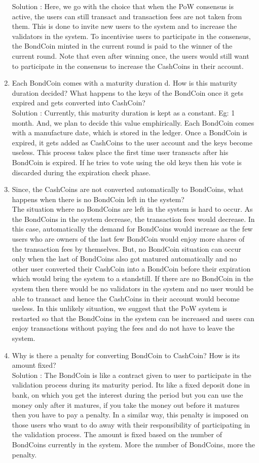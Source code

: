 \begin{enumerate}
    Solution : Here, we go with the choice that when the PoW consensus is active, the users can still transact and transaction fees are not taken from them. This is done to invite new users to the system and to increase the validators in the system. To incentivise users to participate in the consensus, the BondCoin minted in the current round is paid to the winner of the current round. Note that even after winning once, the users would still want to participate in the consensus to increase the CashCoins in their account.
    \item Each BondCoin comes with a maturity duration d. How is this maturity duration decided? What happens to the keys of the BondCoin once it gets expired and gets converted into CashCoin?\\
    Solution : Currently, this maturity duration is kept as a constant. Eg: 1 month. And, we plan to decide this value emphirically. Each BondCoin comes with a manufacture date, which is stored in the ledger. Once a BondCoin is expired, it gets added as CashCoins to the user account and the keys become useless. This process takes place the first time user transacts after his BondCoin is expired. If he tries to vote using the old keys then his vote is discarded during the expiration check phase.
    \item Since, the CashCoins are not converted automatically to BondCoins, what happens when there is no BondCoin left in the system?\\
    The situation where no BondCoins are left in the system is hard to occur. As the BondCoins in the system decrease, the transaction fees would decrease. In this case, automatically the demand for BondCoins would increase as the few users who are owners of the last few BondCoin would enjoy more shares of the transaction fees by themselves. But, no BondCoin situation can occur only when the last of BondCoins also got matured automatically and no other user converted their CashCoin into a BondCoin before their expiration which would bring the system to a standstill. If there are no BondCoin in the system then there would be no validators in the system and no user would be able to transact and hence the CashCoins in their account would become useless. In this unlikely situation, we suggest that the PoW system is restarted so that the BondCoins in the system can be increased and users can enjoy transactions without paying the fees and do not have to leave the system.
    \item Why is there a penalty for converting BondCoin to CashCoin? How is its amount fixed?\\
    Solution : The BondCoin is like a contract given to user to participate in the validation process during its maturity period. Its like a fixed deposit done in bank, on which you get the interest during the period but you can use the money only after it matures, if you take the money out before it matures then you have to pay a penalty. In a similar way, this penalty is imposed on those users who want to do away with their responsibility of participating in the validation process. The amount is fixed based on the number of BondCoins currently in the system. More the number of BondCoins, more the penalty.


\end{enumerate}
